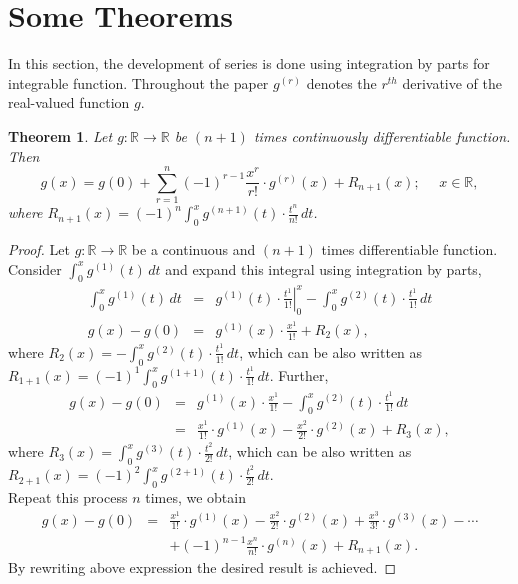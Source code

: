 \documentclass{amsart}
\newtheorem{theorem}{Theorem}[section]
\theoremstyle{definition}
\theoremstyle{remark}
\numberwithin{equation}{section}
\begin{document}
\section{Some Theorems}
In this section, the development of series is done using integration by parts for integrable function. Throughout the paper $g^{(r)}$ denotes the $r^{th}$ derivative of the real-valued function $g$.


\begin{theorem}
 Let $g:\mathbb{R}\longrightarrow\mathbb{R}$ be $(n+1)$ times continuously differentiable function. Then
   \begin{equation}
g(x) = g(0) + \sum_{r=1}^n (-1)^{r-1} \frac{x^r}{r!} \cdot g^{(r)}(x) + R_{n+1}(x);~~~~~~x\in \mathbb{R},
\end{equation}\label{eq1}
where $\displaystyle{ R_{n+1}(x) =(-1)^n \int_0^x g^{(n+1)}(t) \cdot \frac{t^n}{n!} \, dt}$.
\end{theorem}
\begin{proof}
Let $g:\mathbb{R}\longrightarrow\mathbb{R}$ be a continuous and $(n+1)$ times differentiable function. Consider $\displaystyle{\int_0^x g^{(1)}(t) \, dt}$ and expand this integral using integration by parts,
\begin{eqnarray*}
\int_0^x g^{(1)}(t) \, dt &=& \left. g^{(1)}(t) \cdot \frac{t^1}{1!} \right|_0^x - \int_0^x g^{(2)}(t) \cdot \frac{t^1}{1!} \,dt \\
g(x) - g(0)&=&g^{(1)}(x) \cdot \frac{x^1}{1!} + R_2(x),
\end{eqnarray*}
where $\displaystyle{ R_2(x)=- \int_0^x g^{(2)}(t) \cdot \frac{t^1}{1!} \,dt}$, which can be also written as \\
$\displaystyle{ R_{1+1}(x)=(-1)^1 \int_0^x g^{(1+1)}(t) \cdot \frac{t^1}{1!} \,dt}$. Further,
\begin{eqnarray*}
g(x) - g(0) &=& g^{(1)}(x) \cdot \frac{x^1}{1!} - \int_0^x g^{(2)}(t) \cdot \frac{t^1}{1!} \, dt \\
&=&\frac{x^1}{1!} \cdot g^{(1)}(x) - \frac{x^2}{2!} \cdot g^{(2)}(x) + R_3(x),
\end{eqnarray*}
where $\displaystyle{R_3(x) = \int_0^x g^{(3)}(t) \cdot \frac{t^2}{2!} \, dt}$, which can be also written as\\
 $\displaystyle{R_{2+1}(x) = (-1)^2 \int_0^x g^{(2+1)}(t) \cdot \frac{t^2}{2!} \, dt}$.\\
 Repeat this process $n$ times, we obtain
\begin{eqnarray*}
g(x) - g(0) &=&\frac{x^1}{1!} \cdot g^{(1)}(x) - \frac{x^2}{2!} \cdot g^{(2)}(x) + \frac{x^3}{3!} \cdot g^{(3)}(x) - \cdots\\
&~& + (-1)^{n-1} \frac{x^n}{n!} \cdot g^{(n)}(x) + R_{n+1}(x).
\end{eqnarray*}
 By rewriting above expression the desired result is achieved.
\end{proof}
\end{document}
